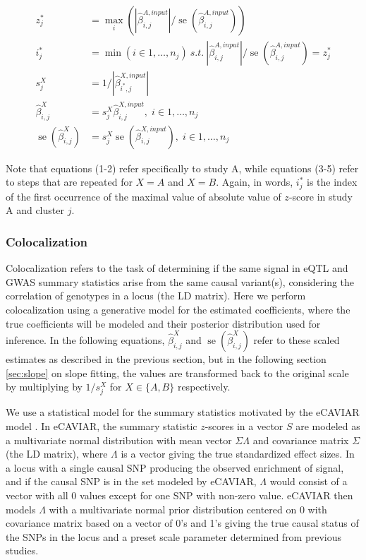 \documentclass[11pt]{article}
\DeclareMathOperator{\se}{\textrm{se}}
\begin{document}
\begin{align}
  z^*_j &= \max_i \left( |\widehat{\beta}^{A,input}_{i,j}|/\se(\widehat{\beta}^{A,input}_{i,j}) \right) \\
  i^*_j &= \min \left(i \in 1,\dots,n_j \right) \  s.t. \  |\widehat{\beta}^{A,input}_{i,j}|/\se(\widehat{\beta}^{A,input}_{i,j}) = z^*_j \\
  s^X_j &= 1/|\widehat{\beta}^{X,input}_{i^*,j}| \\
  \widehat{\beta}^X_{i,j} &= s_j^X \widehat{\beta}^{X,input}_{i,j}, \; i \in 1,\dots,n_j \\
  \se(\widehat{\beta}^X_{i,j}) &= s_j^X \se(\widehat{\beta}^{X,input}_{i,j}), \; i \in 1,\dots,n_j
\end{align}

Note that equations (1-2) refer specifically to study A, while
equations (3-5) refer to steps that are repeated for $X=A$ and
$X=B$. Again, in words, $i^*_j$ is the index of the first occurrence of
the maximal value of absolute value of $z$-score in study A and cluster
$j$.

\subsubsection{Colocalization}

Colocalization refers to the task of determining if the same signal in
eQTL and GWAS summary statistics arise from the same causal variant(s),
considering the correlation of genotypes in a locus (the LD
matrix). Here we perform colocalization using a generative model for
the estimated coefficients, where the true coefficients will be
modeled and their posterior distribution used for inference.
In the following equations, $\widehat{\beta}^X_{i,j}$ and
$\se(\widehat{\beta}^X_{i,j})$ refer to these scaled estimates as
described in the previous section, but in the following section
\ref{sec:slope} on slope fitting, the values are transformed back to
the original scale by multiplying by $1/s^X_j$ for $X \in \{A,B\}$
respectively.

We use a statistical model for the summary statistics motivated by the
eCAVIAR model \citep{eCAVIAR}. In eCAVIAR, the summary statistic
$z$-scores in a vector $S$ are modeled as a multivariate normal
distribution with mean vector $\Sigma \Lambda$ and covariance matrix
$\Sigma$ (the LD matrix), where $\Lambda$ is a vector giving the true
standardized effect sizes. In a locus with a single causal SNP
producing the observed enrichment of signal, and if the causal SNP is
in the set modeled by eCAVIAR, $\Lambda$ would consist of a vector
with all 0 values except for one SNP with non-zero value.  eCAVIAR
then models $\Lambda$ with a multivariate normal prior distribution
centered on 0 with covariance matrix based on a vector of 0's and 1's
giving the true causal status of the SNPs in the locus and a preset
scale parameter determined from previous studies.
\end{document}
